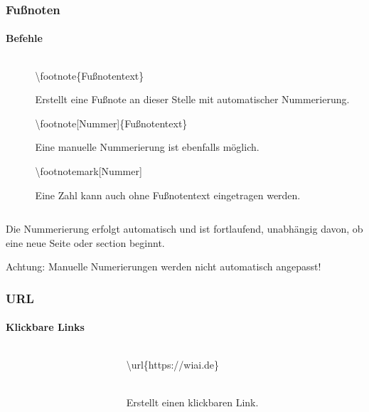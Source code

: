 \begin{frame}
\frametitle{Fu\ss noten}
\framesubtitle{Befehle}
\begin{columns}
\begin{column}{0.5\textwidth}
\begin{ttfamily}\scriptsize

\end{ttfamily}
\end{column}
\begin{column}{0.5\textwidth}
\begin{ttfamily}\color{nounibaredI}\textbackslash footnote\color{black}\{Fu\ss notentext\}\end{ttfamily} Erstellt eine Fußnote an dieser Stelle mit automatischer Nummerierung.

\begin{ttfamily}\color{nounibaredI}\textbackslash footnote\color{nounibagreenI}[Nummer]\color{black}\{Fu\ss notentext\}\end{ttfamily} Eine manuelle Nummerierung ist ebenfalls möglich. 

\begin{ttfamily}\color{nounibaredI}\textbackslash footnotemark\color{nounibagreenI}[Nummer]\color{black}\end{ttfamily}
Eine Zahl kann auch ohne Fußnotentext eingetragen werden.
\end{column}
\end{columns}
\bigskip
Die Nummerierung erfolgt automatisch und ist fortlaufend, unabhängig davon, ob
eine neue Seite oder {\ttfamily section} beginnt.\\[1mm]
\begin{alertblock}{Achtung:}
Manuelle Numerierungen werden nicht automatisch angepasst!
\end{alertblock}
\vspace{-0.5cm}
\end{frame}


\begin{frame}
\frametitle{URL}
\framesubtitle{Klickbare Links}
\begin{columns}
\begin{column}{0.5\textwidth}
\begin{ttfamily}\footnotesize

\end{ttfamily}
\end{column}
\begin{column}{0.5\textwidth}
\begin{ttfamily}\color{nounibaredI}\textbackslash url\color{black}\{https://wiai.de\}\end{ttfamily}\\ 
Erstellt einen klickbaren Link.
\bigskip
\end{column}
\end{columns}
\end{frame}